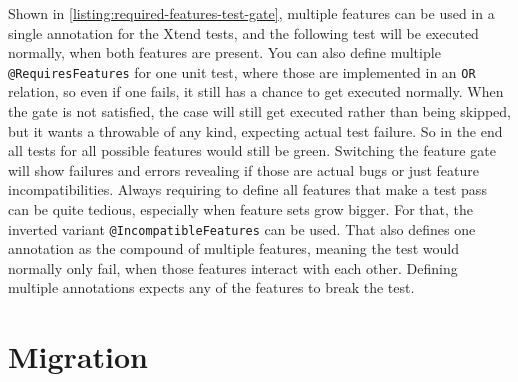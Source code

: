 Shown in \autoref{listing:required-features-test-gate}, multiple features can be used in a single annotation for the Xtend tests, and the following test will be executed normally, when both features are present.
You can also define multiple \texttt{@RequiresFeatures} for one unit test, where those are implemented in an \texttt{OR} relation, so even if one fails, it still has a chance to get executed normally.
When the gate is not satisfied, the case will still get executed rather than being skipped, but it wants a throwable of any kind, expecting actual test failure.
So in the end all tests for all possible features would still be green.
Switching the feature gate will show failures and errors revealing if those are actual bugs or just feature incompatibilities.
Always requiring to define all features that make a test pass can be quite tedious, especially when feature sets grow bigger.
For that, the inverted variant \texttt{@IncompatibleFeatures} can be used.
That also defines one annotation as the compound of multiple features, meaning the test would normally only fail, when those features interact with each other.
Defining multiple annotations expects any of the features to break the test.

\section{Migration}
\label{sec:Implementation:Migration}

